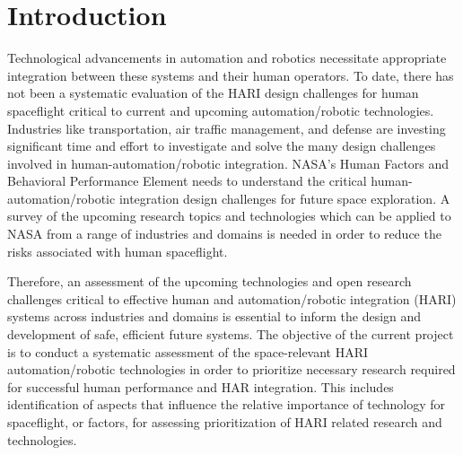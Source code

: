 
\section{Introduction}
Technological advancements in automation and robotics necessitate appropriate integration between these systems and their human operators. To date, there has not been a systematic evaluation of the HARI design challenges for human spaceflight critical to current and upcoming automation/robotic technologies. Industries like transportation, air traffic management, and defense are investing significant time and effort to investigate and solve the many design challenges involved in human-automation/robotic integration. NASA’s Human Factors and Behavioral Performance Element needs to understand the critical human-automation/robotic integration design challenges for future space exploration. A survey of the upcoming research topics and technologies which can be applied to NASA from a range of industries and domains is needed in order to reduce the risks associated with human spaceflight.

Therefore, an assessment of the upcoming technologies and open research challenges critical to effective human and automation/robotic integration (HARI) systems across industries and domains is essential to inform the design and development of safe, efficient future systems. The objective of the current project is to conduct a systematic assessment of the space-relevant HARI automation/robotic technologies in order to prioritize necessary research required for successful human performance and HAR integration. This includes identification of aspects that influence the relative importance of technology for spaceflight, or factors, for assessing prioritization of HARI related research and technologies.

